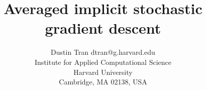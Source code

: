 \documentclass[twoside,11pt]{article}
\begin{document}
\title{Averaged implicit stochastic gradient descent}
\author{\name Dustin Tran \email dtran@g.harvard.edu\\
\addr Institute for Applied Computational Science\\
Harvard University\\
Cambridge, MA 02138, USA
}

\editor{}

\maketitle
\begin{abstract}%
\end{abstract}


\end{document}
